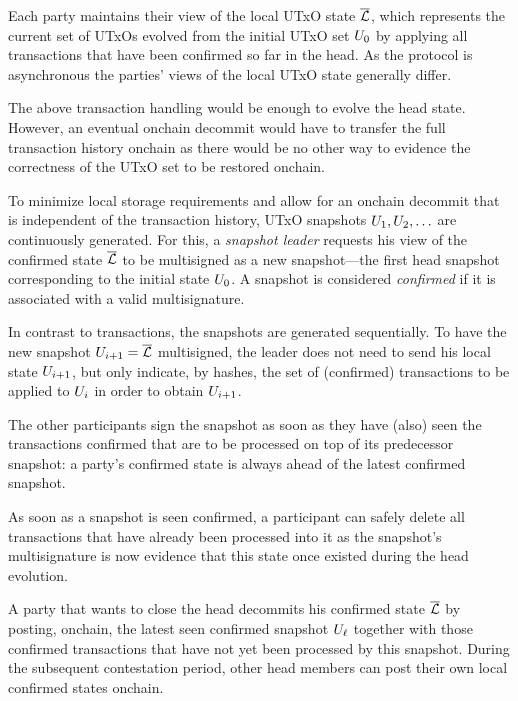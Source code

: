 Each party maintains their view of the local UTxO state $\overline {\mathcal L}$, which
represents the current set of UTxOs evolved from the initial UTxO set
$U_{0}$ by applying all transactions that have been confirmed so far
in the head. As the protocol is asynchronous the parties' views
of the local UTxO state generally differ.

The above transaction handling would be enough to evolve the head state.
However, an eventual onchain decommit would have to transfer the
full transaction history onchain as there would be no other way
to evidence the correctness of the UTxO set to be restored onchain.

To minimize local storage requirements and allow for an
onchain decommit that is independent of the transaction
history, UTxO snapshots $U_1,U_2,\ldots$ are continuously
generated. For this, a \emph{snapshot leader} requests his
view of the confirmed state $\overline {\mathcal L}$ to be multisigned as a new
snapshot---the first head snapshot corresponding to the initial
state $U_{0}$. A snapshot is considered \emph{confirmed} if it
is associated with a valid multisignature.

In contrast to transactions, the snapshots are generated
sequentially.
To have the new snapshot $U_{i+1}=\overline {\mathcal L}$ multisigned, the leader does
not need to send his local state $U_{i+1}$, but only indicate,
by hashes, the set of (confirmed) transactions to be applied to $U_i$
in order to obtain $U_{i+1}$.

The other participants sign the snapshot as soon as they have (also) seen
the transactions confirmed that are to be processed on top of its predecessor
snapshot: a party's confirmed state is always ahead of the latest
confirmed snapshot.

As soon as a snapshot is seen confirmed, a participant can safely
delete all transactions that have already been processed into it as the
snapshot's multisignature is now evidence that this state once existed
during the head evolution.

A party that wants to close the head decommits his confirmed state
$\overline {\mathcal L}$ by posting, onchain, the latest seen confirmed snapshot
$U_\ell$ together with those confirmed transactions that have not
yet been processed by this snapshot.  During the
subsequent contestation period, other head members can post their own
local confirmed states onchain.

